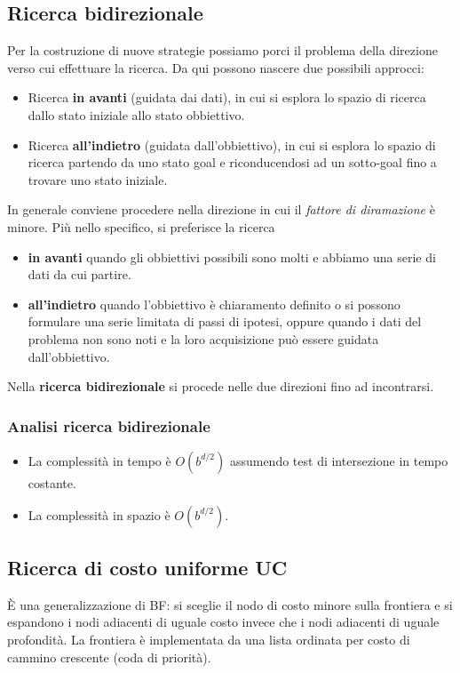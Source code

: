 \subsection{Ricerca bidirezionale}
Per la costruzione di nuove strategie possiamo porci il problema della direzione verso cui
effettuare la ricerca.
Da qui possono nascere due possibili approcci:
\begin{itemize}
	\item Ricerca \textbf{in avanti} (guidata dai dati), in cui si esplora lo spazio di
	      ricerca dallo stato iniziale allo stato obbiettivo.
	\item Ricerca \textbf{all'indietro} (guidata dall'obbiettivo), in cui si esplora lo
	      spazio di ricerca partendo da uno stato goal e riconducendosi ad un sotto-goal
	      fino a trovare uno stato iniziale.
\end{itemize}
In generale conviene procedere nella direzione in cui il \emph{fattore di diramazione}
\`e minore.
Pi\`u nello specifico, si preferisce la ricerca
\begin{itemize}
	\item \textbf{in avanti} quando gli obbiettivi possibili sono molti e abbiamo una
	      serie di dati da cui partire.
	\item \textbf{all'indietro} quando l'obbiettivo \`e chiaramento definito o si possono
	      formulare una serie limitata di passi di ipotesi, oppure quando i dati del
	      problema non sono noti e la loro acquisizione pu\`o essere guidata
	      dall'obbiettivo.
\end{itemize}
Nella \textbf{ricerca bidirezionale} si procede nelle due direzioni fino ad incontrarsi.

\subsubsection{Analisi ricerca bidirezionale}
\begin{itemize}
	\item La complessit\`a in tempo \`e $O(b^{d/2})$ assumendo test di intersezione in
	      tempo costante.
	\item La complessit\`a in spazio \`e $O(b^{d/2})$.
\end{itemize}

\subsection{Ricerca di costo uniforme UC}
\`E una generalizzazione di BF: si sceglie il nodo di costo minore
sulla frontiera e si espandono i nodi adiacenti di uguale costo invece che i nodi
adiacenti di uguale profondit\`a.
La frontiera \`e implementata da una lista ordinata per costo di cammino crescente (coda
di priorit\`a).

